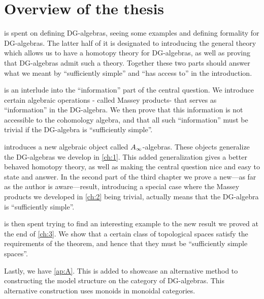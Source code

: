 

\section{Overview of the thesis}

\textit{} is spent on defining DG-algebras, seeing some examples and  defining formality for DG-algebras. The latter half of it is designated to introducing the general theory which allows us to have a homotopy theory for DG-algebras, as well as proving that DG-algebras admit such a theory. Together these two parts should answer what we meant by ``sufficiently simple'' and ``has access to'' in the introduction.

\textit{} is an interlude into the ``information'' part of the central question. We introduce certain algebraic operations - called Massey products- that serves as ``information'' in the DG-algebra. We then prove that this information is not accessible to the cohomology algebra, and that all such ``information'' must be trivial if the DG-algebra is ``sufficiently simple''. 

\textit{} introduces a new algebraic object called $A_{\infty}$-algebras. These objects generalize the DG-algebras we develop in \cref{ch:1}. This added generalization gives a better behaved homotopy theory, as well as making the central question nice and easy to state and answer. In the second part of the third chapter we prove a new---as far as the author is aware---result, introducing a special case where the Massey products we developed in \cref{ch:2} being trivial, actually means that the DG-algebra is ``sufficiently simple''. 

\textit{} is then spent trying to find an interesting example to the new result we proved at the end of \cref{ch:3}. We show that a certain class of topological spaces satisfy the requirements of the theorem, and hence that they must be ``sufficiently simple spaces''. 

Lastly, we have \cref{ap:A}. This is added to showcase an alternative method to constructing the model structure on the category of DG-algebras. This alternative construction uses monoids in monoidal categories. 


